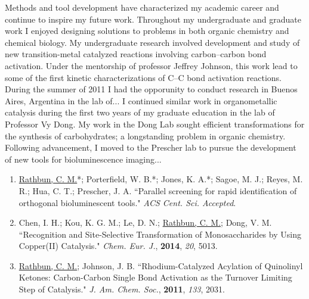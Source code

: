 \documentclass{nihbiosketch}
\begin{document}
\begin{statement}
Methods and tool development have characterized my academic career and continue
to inspire my future work. Throughout my undergraduate and graduate work I
enjoyed designing solutions to problems in both organic chemistry and chemical
biology. My undergraduate research involved development and study of new
transition-metal catalyzed reactions involving carbon--carbon bond activation.
Under the mentorship of professor Jeffrey Johnson, this work lead to some of the
first kinetic characterizations of C--C bond activation reactions. During the
summer of 2011 I had the opporunity to conduct research in Buenos Aires,
Argentina in the lab of... %
I continued similar work in organometallic catalysis during the first two years of my
graduate education in the lab of Professor Vy Dong. My work in the Dong Lab
sought efficient transformations for the synthesis of carbohydrates; a longstanding
problem in organic chemistry. Following advancement, I moved to the Prescher lab %
to pursue the development of new tools for bioluminescence imaging... %

\begin{enumerate} %

  \item \underline{Rathbun, C. M.}*; Porterfield, W. B.*; Jones, K. A.*; Sagoe, M. J.; Reyes, M. R.; Hua, C. T.; Prescher, J. A. ``Parallel screening for rapid identification of orthogonal bioluminescent tools." \textit{ACS Cent. Sci. Accepted}. %

  \item Chen, I. H.; Kou, K. G. M.; Le, D. N.; \underline{Rathbun, C. M.}; Dong, V. M. ``Recognition and Site-Selective Transformation of Monosaccharides by Using Copper(II) Catalysis." \textit{Chem. Eur. J.}, \textbf{2014}, \textit{20}, 5013.

  \item \underline{Rathbun, C. M.}; Johnson, J. B. ``Rhodium-Catalyzed Acylation of Quinolinyl Ketones: Carbon-Carbon Single Bond Activation as the Turnover Limiting Step of Catalysis." \textit{J. Am. Chem. Soc.}, \textbf{2011}, \textit{133}, 2031.

\end{enumerate}

\end{statement}

\end{document}

